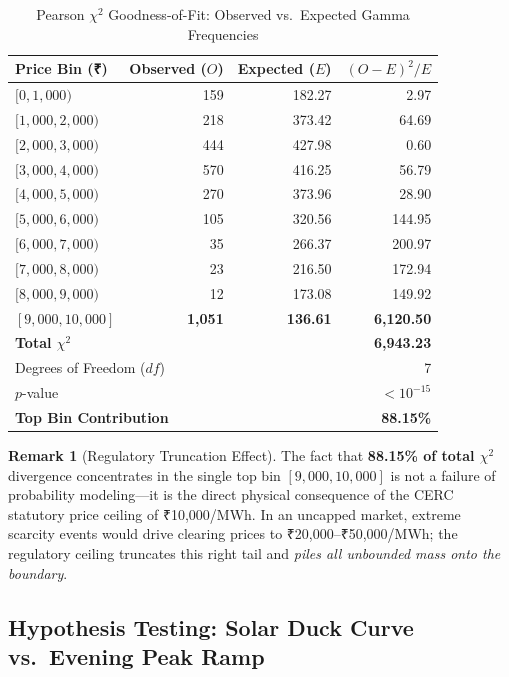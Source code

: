 \documentclass[12pt, a4paper]{article}
\theoremstyle{definition}
\newtheorem{remark}{Remark}[section]
\begin{document}
\begin{table}[H]
\centering
\caption{Pearson $\chi^2$ Goodness-of-Fit: Observed vs.\ Expected Gamma Frequencies}
\label{tab:chisq}
\small
\begin{tabular}{l r r r}
\toprule
\textbf{Price Bin (₹)} & \textbf{Observed ($O$)} & \textbf{Expected ($E$)} & \textbf{$(O-E)^2/E$} \\
\midrule
$[0, 1{,}000)$ & 159 & 182.27 & 2.97 \\
$[1{,}000, 2{,}000)$ & 218 & 373.42 & 64.69 \\
$[2{,}000, 3{,}000)$ & 444 & 427.98 & 0.60 \\
$[3{,}000, 4{,}000)$ & 570 & 416.25 & 56.79 \\
$[4{,}000, 5{,}000)$ & 270 & 373.96 & 28.90 \\
$[5{,}000, 6{,}000)$ & 105 & 320.56 & 144.95 \\
$[6{,}000, 7{,}000)$ & 35 & 266.37 & 200.97 \\
$[7{,}000, 8{,}000)$ & 23 & 216.50 & 172.94 \\
$[8{,}000, 9{,}000)$ & 12 & 173.08 & 149.92 \\
\textbf{$[9{,}000, 10{,}000]$} & \textbf{1,051} & \textbf{136.61} & \textbf{6,120.50} \\
\midrule
\multicolumn{3}{l}{\textbf{Total $\chi^2$}} & \textbf{6,943.23} \\
\multicolumn{3}{l}{Degrees of Freedom ($df$)} & 7 \\
\multicolumn{3}{l}{$p$-value} & $< 10^{-15}$ \\
\multicolumn{3}{l}{\textbf{Top Bin Contribution}} & \textbf{88.15\%} \\
\bottomrule
\end{tabular}
\end{table}

\begin{remark}[Regulatory Truncation Effect]
The fact that \textbf{88.15\% of total $\chi^2$} divergence concentrates in the single top bin $[9{,}000, 10{,}000]$ is not a failure of probability modeling---it is the direct physical consequence of the CERC statutory price ceiling of ₹10,000/MWh. In an uncapped market, extreme scarcity events would drive clearing prices to ₹20,000--₹50,000/MWh; the regulatory ceiling truncates this right tail and \emph{piles all unbounded mass onto the boundary}.
\end{remark}

\subsection{Hypothesis Testing: Solar Duck Curve vs.\ Evening Peak Ramp}
\end{document}
